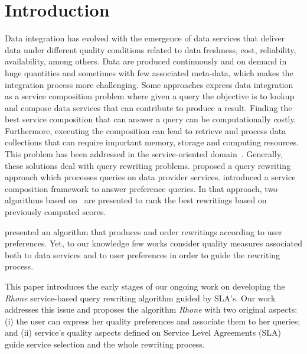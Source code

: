 \section{Introduction}
Data integration has evolved with the emergence of data services that deliver
data under different quality conditions related to data freshness, cost, reliability,
availability, among others. Data are produced continuously and on demand in huge
quantities and sometimes with few associated meta-data, which makes the
integration process more challenging. Some approaches express data integration
as a service composition problem where given a query the objective is to lookup and compose data services that can contribute to produce a result. Finding the best service composition that can answer a query can be computationally costly. Furthermore,  executing the composition can lead to retrieve and process data collections that can require important memory, storage and computing resources.
This problem has been addressed in the service-oriented
domain~\cite{Barhamgi2010,Benouaret2011,ba2014}.
Generally, these solutions deal with query rewriting problems.
\cite{Barhamgi2010} proposed a query rewriting approach which processes queries
on data provider services. \cite{Benouaret2011} introduced a service composition
framework to answer preference queries. In that approach, two algorithms based
on~\cite{Barhamgi2010} are presented to rank the best rewritings based on previously computed scores.

\cite{ba2014} presented an algorithm that produces and order rewritings
according to user preferences. Yet, to our knowledge few works consider quality
measures associated both to data services and to user preferences in order to
guide the rewriting process. 


This paper introduces the early stages of our
ongoing work on developing the \textit{Rhone} service-based query rewriting
algorithm guided by SLA's. Our work addresses this issue and proposes the 
algorithm \textit{Rhone} with two original aspects: (i) the user can express
her quality preferences and associate them to her queries; and (ii)  service's
quality aspects defined on Service Level Agreements (SLA) guide service
selection and  the whole rewriting process.

